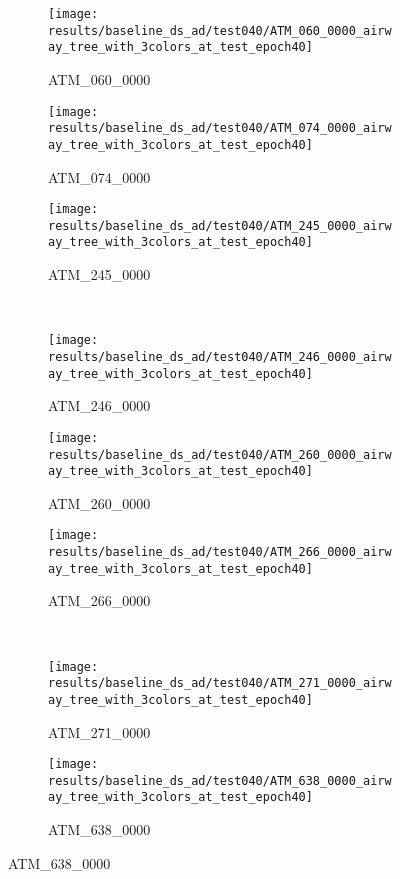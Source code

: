 \begin{figure}[!htp]
    \centering
    \begin{subfigure}{0.325\textwidth}
        \texttt{[image: results/baseline\_ds\_ad/test040/ATM\_060\_0000\_airway\_tree\_with\_3colors\_at\_test\_epoch40]}
        \caption{ATM\_060\_0000}
    \end{subfigure}
    \hfill
    \begin{subfigure}{0.325\textwidth}
        \texttt{[image: results/baseline\_ds\_ad/test040/ATM\_074\_0000\_airway\_tree\_with\_3colors\_at\_test\_epoch40]}
        \caption{ATM\_074\_0000}
    \end{subfigure}
    \hfill
    \begin{subfigure}{0.325\textwidth}
        \texttt{[image: results/baseline\_ds\_ad/test040/ATM\_245\_0000\_airway\_tree\_with\_3colors\_at\_test\_epoch40]}
        \caption{ATM\_245\_0000}
    \end{subfigure}
    \\
    \begin{subfigure}{0.325\textwidth}
        \texttt{[image: results/baseline\_ds\_ad/test040/ATM\_246\_0000\_airway\_tree\_with\_3colors\_at\_test\_epoch40]}
        \caption{ATM\_246\_0000}
    \end{subfigure}
    \hfill
    \begin{subfigure}{0.325\textwidth}
        \texttt{[image: results/baseline\_ds\_ad/test040/ATM\_260\_0000\_airway\_tree\_with\_3colors\_at\_test\_epoch40]}
        \caption{ATM\_260\_0000}
    \end{subfigure}
    \hfill
    \begin{subfigure}{0.325\textwidth}
        \texttt{[image: results/baseline\_ds\_ad/test040/ATM\_266\_0000\_airway\_tree\_with\_3colors\_at\_test\_epoch40]}
        \caption{ATM\_266\_0000}
    \end{subfigure}
    \\
    \begin{subfigure}{0.325\textwidth}
        \texttt{[image: results/baseline\_ds\_ad/test040/ATM\_271\_0000\_airway\_tree\_with\_3colors\_at\_test\_epoch40]}
        \caption{ATM\_271\_0000}
    \end{subfigure}
    \hfill
    \begin{subfigure}{0.325\textwidth}
        \texttt{[image: results/baseline\_ds\_ad/test040/ATM\_638\_0000\_airway\_tree\_with\_3colors\_at\_test\_epoch40]}
        \caption{ATM\_638\_0000}
    \end{subfigure}

\end{figure}

